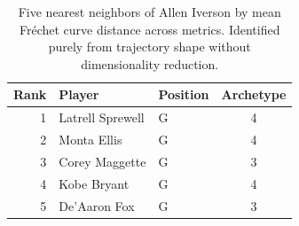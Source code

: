 \begin{table}[htbp]
  \centering\small
  \begin{tabular}{rllc}
    \toprule
    Rank & Player & Position & Archetype \\
    \midrule
    1 & Latrell Sprewell & G & 4 \\
    2 & Monta Ellis & G & 4 \\
    3 & Corey Maggette & G & 3 \\
    4 & Kobe Bryant & G & 4 \\
    5 & De'Aaron Fox & G & 3 \\
    \bottomrule
  \end{tabular}
  \caption{Five nearest neighbors of Allen Iverson by mean Fr\'{e}chet curve distance across metrics. Identified purely from trajectory shape without dimensionality reduction.}
  \label{tab:Allen_Iverson_frechet_curve_neighbors}
\end{table}

